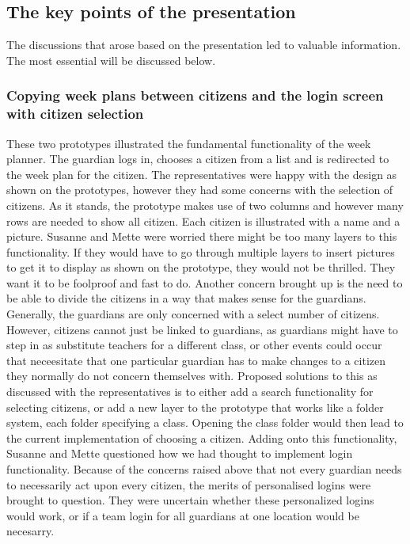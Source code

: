 \subsection{The key points of the presentation}
The discussions that arose based on the presentation led to valuable information. The most essential will be discussed below.

\subsubsection{Copying week plans between citizens and the login screen with citizen selection}
These two prototypes illustrated the fundamental functionality of the week planner. The guardian logs in, chooses a citizen from a list and is redirected to the week plan for the citizen.
The representatives were happy with the design as shown on the prototypes, however they had some concerns with the selection of citizens.
As it stands, the prototype makes use of two columns and however many rows are needed to show all citizen.
Each citizen is illustrated with a name and a picture.
Susanne and Mette were worried there might be too many layers to this functionality.
If they would have to go through multiple layers to insert pictures to get it to display as shown on the prototype, they would not be thrilled.
They want it to be foolproof and fast to do.
Another concern brought up is the need to be able to divide the citizens in a way that makes sense for the guardians.
Generally, the guardians are only concerned with a select number of citizens.
However, citizens cannot just be linked to guardians, as guardians might have to step in as substitute teachers for a different class, or other events could occur that neceesitate that one particular guardian has to make changes to a citizen they normally do not concern themselves with.
Proposed solutions to this as discussed with the representatives is to either add a search functionality for selecting citizens, or add a new layer to the prototype that works like a folder system, each folder specifying a class.
Opening the class folder would then lead to the current implementation of choosing a citizen.
Adding onto this functionality, Susanne and Mette questioned how we had thought to implement login functionality.
Because of the concerns raised above that not every guardian needs to necessarily act upon every citizen, the merits of personalised logins were brought to question.
They were uncertain whether these personalized logins would work, or if a team login for all guardians at one location would be necesarry. 
